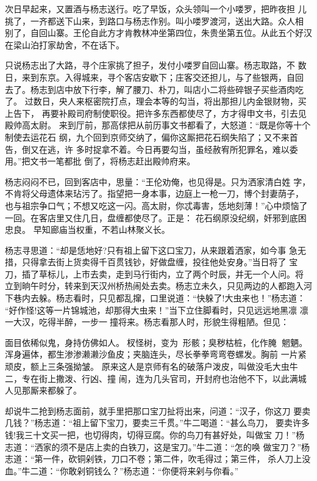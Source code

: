 次日早起来，又置酒与杨志送行。吃了早饭，众头领叫一个小喽罗，把昨夜担
儿挑了，一齐都送下山来，到路口与杨志作别。叫小喽罗渡河，送出大路。众人相
别了，自回山寨。王伦自此方才肯教林冲坐第四位，朱贵坐第五位。从此五个好汉
在梁山泊打家劫舍，不在话下。

只说杨志出了大路，寻个庄家挑了担子，发付小喽罗自回山寨。杨志取路，不
数日，来到东京。入得城来，寻个客店安歇下；庄客交还担儿，与了些银两，自回
去了。杨志到店中放下行李，解了腰刀、朴刀，叫店小二将些碎银子买些酒肉吃了。
过数日，央人来枢密院打点，理会本等的勾当，将出那担儿内金银财物，买上告下，
再要补殿司府制使职役。把许多东西都使尽了，方才得申文书，引去见殿帅高太尉。
来到厅前，那高俅把从前历事文书都看了，大怒道：“既是你等十个制使去运花石
纲，九个回到京师交纳了，偏你这厮把花石纲失陷了；又不来首告，倒又在逃，许
多时捉拿不着。今日再要勾当，虽经赦宥所犯罪名，难以委用。”把文书一笔都批
倒了，将杨志赶出殿帅府来。

杨志闷闷不已，回到客店中，思量：“王伦劝俺，也见得是。只为洒家清白姓
字，不肯将父母遗体来玷污了。指望把一身本事，边庭上一枪一刀，博个封妻荫子，
也与祖宗争口气；不想又吃这一闪。高太尉，你忒毒害，恁地刻薄！”心中烦恼了
一回。在客店里又住几日，盘缠都使尽了。正是：
花石纲原没纪纲，奸邪到底困忠良。
早知廊庙当权重，不若山林聚义长。

杨志寻思道：“却是恁地好?只有祖上留下这口宝刀，从来跟着洒家，如今事
急无措，只得拿去街上货卖得千百贯钱钞，好做盘缠，投往他处安身。”当日将了
宝刀，插了草标儿，上市去卖，走到马行街内，立了两个时辰，并无一个人问。将
立到晌午时分，转来到天汉州桥热闹处去卖。杨志立未久，只见两边的人都跑入河
下巷内去躲。杨志看时，只见都乱撺，口里说道：“快躲了!大虫来也！”杨志道：
“好作怪!这等一片锦城池，却那得大虫来！”当下立住脚看时，只见远远地黑凛
凛一大汉，吃得半醉，一步一撞将来。杨志看那人时，形貌生得粗陋。但见：

面目依稀似鬼，身持仿佛如人。杈怪树，变为形骸；臭秽枯桩，化作腌
魍魉。浑身遍体，都生渗渗濑濑沙鱼皮；夹脑连头，尽长拳拳弯弯卷螺发。胸前
一片紧顽皮，额上三条强拗皱。
原来这人是京师有名的破落户泼皮，叫做没毛大虫牛二，专在街上撒泼、行凶、撞
闹，连为几头官司，开封府也治他不下，以此满城人见那厮来都躲了。

却说牛二抢到杨志面前，就手里把那口宝刀扯将出来，问道：“汉子，你这刀
要卖几钱？”杨志道：“祖上留下宝刀，要卖三千贯。”牛二喝道：“甚么鸟刀，
要卖许多钱!我三十文买一把，也切得肉，切得豆腐。你的鸟刀有甚好处，叫做宝
刀！”杨志道：“洒家的须不是店上卖的白铁刀，这是宝刀。”牛二道：“怎的唤
做宝刀？”杨志道：“第一件，砍铜剁铁，刀口不卷；第二件，吹毛得过；第三件，
杀人刀上没血。”牛二道：“你敢剁铜钱么？”杨志道：“你便将来剁与你看。”

